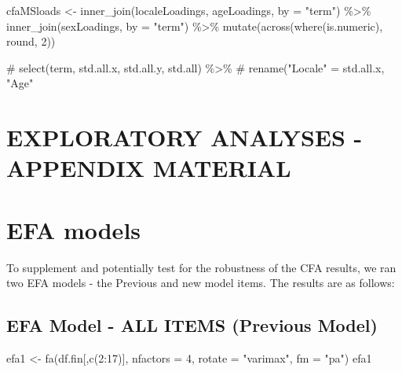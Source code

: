 \documentclass[
  letterpaper,
  DIV=11,
  numbers=noendperiod]{scrartcl}
\newenvironment{Shaded}{\begin{snugshade}}{\end{snugshade}}
\newcommand{\AttributeTok}[1]{\textcolor[rgb]{0.40,0.45,0.13}{#1}}
\newcommand{\CommentTok}[1]{\textcolor[rgb]{0.37,0.37,0.37}{#1}}
\newcommand{\DecValTok}[1]{\textcolor[rgb]{0.68,0.00,0.00}{#1}}
\newcommand{\FunctionTok}[1]{\textcolor[rgb]{0.28,0.35,0.67}{#1}}
\newcommand{\NormalTok}[1]{\textcolor[rgb]{0.00,0.23,0.31}{#1}}
\newcommand{\OtherTok}[1]{\textcolor[rgb]{0.00,0.23,0.31}{#1}}
\newcommand{\SpecialCharTok}[1]{\textcolor[rgb]{0.37,0.37,0.37}{#1}}
\newcommand{\StringTok}[1]{\textcolor[rgb]{0.13,0.47,0.30}{#1}}
\begin{document}
\begin{Shaded}
\begin{Highlighting}[]
\NormalTok{cfaMSloads }\OtherTok{\textless{}{-}} \FunctionTok{inner\_join}\NormalTok{(localeLoadings, ageLoadings, }\AttributeTok{by =} \StringTok{"term"}\NormalTok{) }\SpecialCharTok{\%\textgreater{}\%}
  \FunctionTok{inner\_join}\NormalTok{(sexLoadings, }\AttributeTok{by =} \StringTok{"term"}\NormalTok{) }\SpecialCharTok{\%\textgreater{}\%}
  \FunctionTok{mutate}\NormalTok{(}\FunctionTok{across}\NormalTok{(}\FunctionTok{where}\NormalTok{(is.numeric), round, }\DecValTok{2}\NormalTok{))}

\CommentTok{\#  select(term, std.all.x, std.all.y, std.all) \%\textgreater{}\%}
\CommentTok{\#  rename("Locale" = std.all.x, "Age"}
\end{Highlighting}
\end{Shaded}

\section{EXPLORATORY ANALYSES - APPENDIX
MATERIAL}\label{exploratory-analyses---appendix-material}

\section{EFA models}\label{efa-models}

To supplement and potentially test for the robustness of the CFA
results, we ran two EFA models - the Previous and new model items. The
results are as follows:

\subsection{EFA Model - ALL ITEMS (Previous
Model)}\label{efa-model---all-items-previous-model}

\begin{Shaded}
\begin{Highlighting}[]
\NormalTok{efa1 }\OtherTok{\textless{}{-}} \FunctionTok{fa}\NormalTok{(df.fin[,}\FunctionTok{c}\NormalTok{(}\DecValTok{2}\SpecialCharTok{:}\DecValTok{17}\NormalTok{)], }\AttributeTok{nfactors =} \DecValTok{4}\NormalTok{, }\AttributeTok{rotate =} \StringTok{"varimax"}\NormalTok{, }\AttributeTok{fm =} \StringTok{"pa"}\NormalTok{)}
\NormalTok{efa1}
\end{Highlighting}
\end{Shaded}
\end{document}
